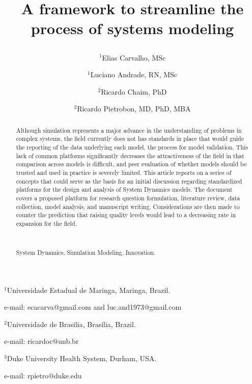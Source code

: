 \documentclass[11pt]{article}
\def\noi{\noindent}
\begin{document}

\title{%
A framework to streamline the process of systems modeling
\author{$^1$Elias Carvalho, MSc
\and $^1$Luciano Andrade, RN, MSc
\and $^2$Ricardo Chaim, PhD  
\and $^3$Ricardo Pietrobon, MD, PhD, MBA
}
\date{}
}
\maketitle

\noi $^1$Universidade Estadual de Maringa,  Maringa, Brazil.

\noi e-mail: ecacarva@gmail.com and luc.and1973@gmail.com %

\medskip

\noi $^2$Universidade de Brasilia, Brasilia, Brazil.

\noi e-mail: ricardoc@unb.br

\medskip

\noi $^3$Duke University Health System, Durham, USA.

\noi e-mail: rpietro@duke.edu



\begin{abstract}
Although simulation represents a major advance in the understanding of problems in complex systems, the field currently does not has standards in place that would guide the reporting of the data underlying each model, the process for model validation.  This lack of common platforms significantly decreases the attractiveness of the field in that comparison across models is difficult, and peer evaluation of whether models should be trusted and used in practice is severely limited.  This article reports on a series of concepts that could serve as the basis for an initial discussion regarding standardized platforms for the design and analysis of System Dynamics models.  The document covers a proposed platform for research question formulation, literature review, data collection, model analysis, and manuscript writing.  Considerations are then made to counter the prediction that raising quality levels would lead to a decreasing rate in expansion for the field.

\

 System Dynamics, Simulation Modeling, Innovation.

\end{abstract}
\end{document}
